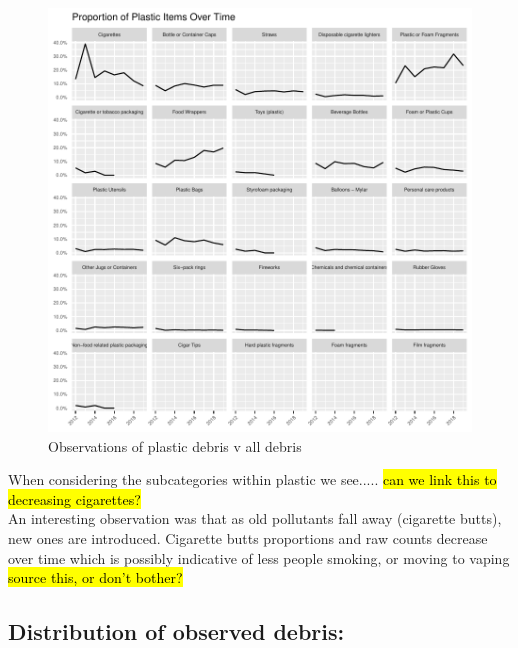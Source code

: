 \documentclass[10pt]{article}\usepackage[]{graphicx}\usepackage[]{color}
\newenvironment{knitrout}{}{} %
\begin{document}
\begin{figure}[H]
\begin{center}
\begin{knitrout}
\includegraphics[width=1\linewidth]{figure/unnamed-chunk-28-1} 

\end{knitrout}
\caption {Observations of plastic debris v all debris}
\label{figF4}
\end {center}
\end {figure}


When considering the subcategories within plastic we see..... \hl{can we link this to decreasing cigarettes?}\\
An interesting observation was that as old pollutants fall away (cigarette butts), new ones are introduced. Cigarette butts proportions and raw counts decrease over time which is possibly indicative of less people smoking, or moving to vaping \hl{source this, or don't bother?}\\


\pagebreak
\subsection {Distribution of observed debris:}
\end{document}
